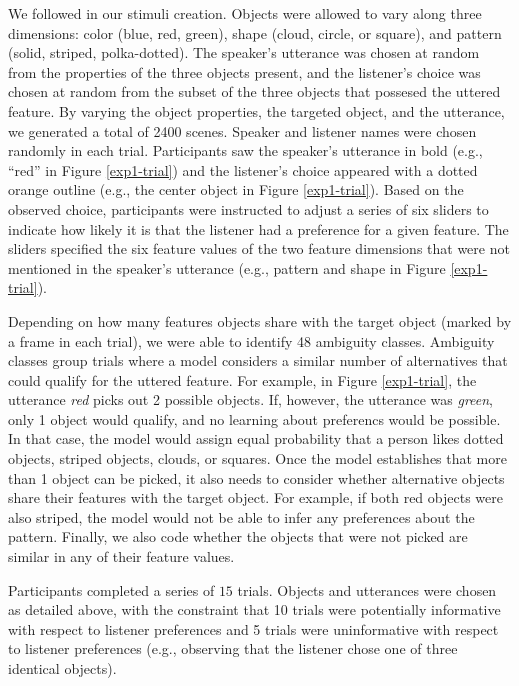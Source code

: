 \documentclass[10pt,a4paper]{article}
\begin{document}
We followed  in our stimuli creation. Objects were allowed to vary along three dimensions: color (blue, red, green), shape (cloud, circle, or square), and pattern (solid, striped, polka-dotted). The speaker's utterance was chosen at random from the properties of the three objects present, and the listener's choice was chosen at random from the subset of the three objects that possesed the uttered feature. By varying the object properties, the targeted object, and the utterance, we generated a total of 2400 scenes. Speaker and listener names were chosen randomly in each trial. Participants saw the speaker's utterance in bold (e.g., ``red'' in Figure \ref{exp1-trial}) and the listener's choice appeared with a dotted orange outline (e.g., the center object in Figure \ref{exp1-trial}). Based on the observed choice, participants were instructed to adjust a series of six sliders to indicate how likely it is that the listener had a preference for a given feature. The sliders specified the six feature values of the two feature dimensions that were not mentioned in the speaker's utterance (e.g., pattern and shape in Figure \ref{exp1-trial}). 

Depending on how many features objects share with the target object (marked by a frame in each trial), we were able to identify 48 ambiguity classes. Ambiguity classes group trials where a model considers a similar number of alternatives that could qualify for the uttered feature. For example, in Figure \ref{exp1-trial}, the utterance \textit{red} picks out 2 possible objects. If, however, the utterance was \textit{green}, only 1 object would qualify, and no learning about preferencs would be possible. In that case, the model would assign equal probability that a person likes dotted objects, striped objects, clouds, or squares. Once the model establishes that more than 1 object can be picked, it also needs to consider whether alternative objects share their features with the target object. For example, if both red objects were also striped, the model would not be able to infer any preferences about the pattern. Finally, we also code whether the objects that were not picked are similar in any of their feature values.

Participants completed a series of $15$ trials. Objects and utterances were chosen as detailed above, with the constraint that 10 trials were potentially informative with respect to listener preferences and 5 trials were uninformative with respect to listener preferences (e.g., observing that the listener chose one of three identical objects). 
\end{document}
